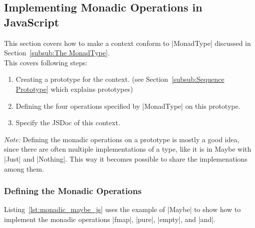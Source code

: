 
\subsection{Implementing Monadic Operations in JavaScript} %
\label{sub:Implementing Monadic Operations in JavaScript}
This section covers how to make a context conform to |MonadType| discussed in
Section~\ref{subsub:The MonadType}.\\ 
This covers following steps:
\begin{enumerate}
  \item Creating a prototype for the context. (see Section~\ref{subsub:Sequence
    Prototype} which explains prototypes)
  \item Defining the four operations specified by |MonadType| on this
    prototype.
  \item Specify the JSDoc of this context.
\end{enumerate}

\textit{Note:} Defining the monadic operations on a prototype is mostly a good
idea, since there are often multiple implementations of a type, like it is in
Maybe with |Just| and |Nothing|. This way it becomes possible to share the
implemenations among them.

\subsubsection{Defining the Monadic Operations} %
\label{subsub:Defining the Monadic Operations}
Listing~\ref{lst:monadic_maybe_js} uses the example of |Maybe| to show how to
implement the monadic operations |fmap|, |pure|, |empty|, and |and|.

